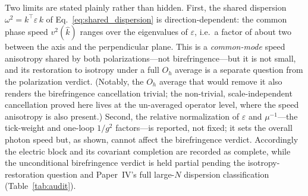 Two limits are stated plainly rather than hidden. First, the shared dispersion
$\omega^2=k^{\!\top}\varepsilon\,k$ of Eq.~\eqref{eq:shared_dispersion} is
direction-dependent: the common phase speed $v^2(\hat k)$ ranges over the
eigenvalues of $\varepsilon$, i.e.\ a factor of about two between the axis and the
perpendicular plane. This is a \emph{common-mode} speed anisotropy shared by both
polarizations---not birefringence---but it is not small, and its restoration to
isotropy under a full $O_h$ average is a separate question from the polarization
verdict. (Notably, the $O_h$ average that would remove it also renders the
birefringence cancellation trivial; the non-trivial, scale-independent
cancellation proved here lives at the un-averaged operator level, where the speed
anisotropy is also present.) Second, the relative normalization of $\varepsilon$
and $\mu^{-1}$---the tick-weight and one-loop $1/g^2$ factors---is reported, not
fixed; it sets the overall photon speed but, as shown, cannot affect the
birefringence verdict. Accordingly the electric block and its covariant completion
are recorded as complete, while the unconditional birefringence verdict is held
partial pending the isotropy-restoration question and Paper~IV's full
large-$N$ dispersion classification (Table~\ref{tab:audit}).
